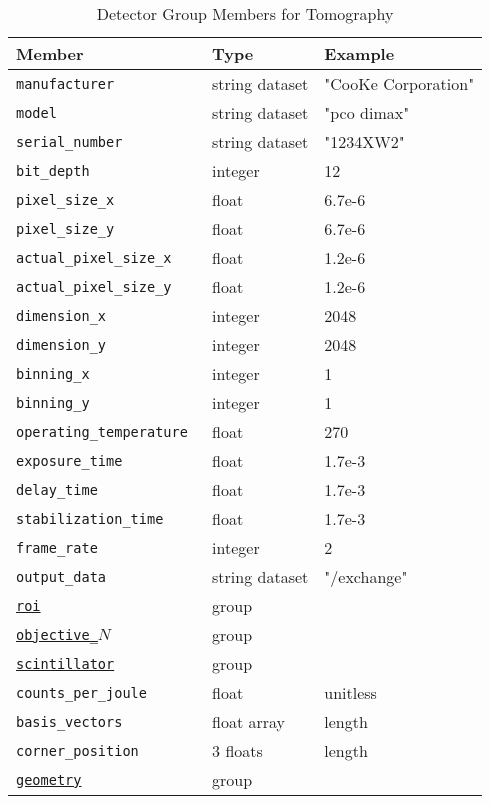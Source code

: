 \begin{table}[h!]\sffamily \footnotesize
\caption{Detector Group Members for Tomography}
\centering
{}
\begin{tabular}{l l l}
\toprule
\bfseries Member     & \bfseries Type & \bfseries Example \\
\midrule
\tt{manufacturer} & string dataset & "CooKe Corporation" \\   
\tt{model} & string dataset &  "pco dimax" \\
\tt{serial\_number} & string dataset &  "1234XW2" \\  
\tt{bit\_depth} & integer & 12 \\     
\tt{pixel\_size\_x} & float & 6.7e-6 \\
\tt{pixel\_size\_y} & float & 6.7e-6 \\
\tt{actual\_pixel\_size\_x} & float & 1.2e-6 \\
\tt{actual\_pixel\_size\_y} & float & 1.2e-6 \\
\tt{dimension\_x} & integer & 2048 \\
\tt{dimension\_y} & integer & 2048 \\
\tt{binning\_x} & integer & 1 \\
\tt{binning\_y} & integer & 1 \\
\tt{operating\_temperature} & float &  270 \\     
\tt{exposure\_time} & float & 1.7e-3 \\   
\tt{delay\_time} & float & 1.7e-3 \\   
\tt{stabilization\_time} & float & 1.7e-3 \\   
\tt{frame\_rate} & integer &  2 \\
\tt{output\_data} & string dataset & "/exchange" \\
\hyperref[table:roi]{\tt{roi}} & group & \\
\hyperref[table:objective]{\tt{objective\_$N$}} & group & \\
\hyperref[table:scintillator]{\tt{scintillator}} & group &\\
\tt{counts\_per\_joule} & float & unitless \\ 
\tt{basis\_vectors} & float array & length \\ 
\tt{corner\_position} & 3 floats & length \\
\hyperref[tomo:geometry]{\tt{geometry}} & group & \\
\bottomrule
\end{tabular}
\end{table}

